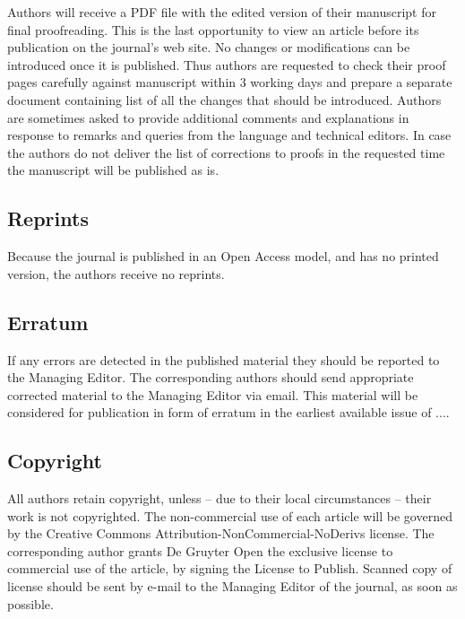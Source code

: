Authors will receive a PDF file with the edited version of their manuscript for final proofreading. This is the last opportunity to view an article before its publication on the journal's web site. No changes or modifications can be introduced once it is published. Thus authors are requested to check their proof pages carefully against manuscript within 3 working days and prepare a separate document containing list of all the changes that should be introduced. Authors are sometimes asked to provide additional comments and explanations in response to remarks and queries from the language and technical editors. In case the authors do not deliver the list of corrections to proofs in the requested time the manuscript will be published as is.

 

\subsection{Reprints}

Because the journal is published in an Open Access model, and has no printed version, the authors receive no reprints.

\subsection{Erratum}

If any errors are detected in the published material they should be reported to the Managing Editor. The corresponding authors should send appropriate corrected material to the Managing Editor via email. This material will be considered for publication in form of erratum in the earliest available issue of ....

\subsection{Copyright  }

All authors retain copyright, unless -- due to their local circumstances -- their work is not copyrighted. The non-commercial use of each article will be governed by the Creative Commons Attribution-NonCommercial-NoDerivs license. The corresponding author grants De Gruyter Open the exclusive license to commercial use of the article, by signing the License to Publish. Scanned copy of license should be sent by e-mail to the Managing Editor of the journal, as soon as possible.



